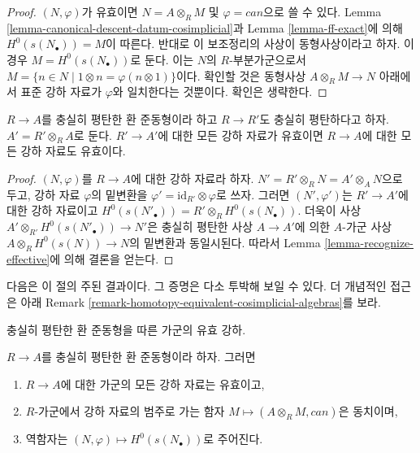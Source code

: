 \begin{proof}
$(N, \varphi)$가 유효이면 $N = A \otimes_R M$ 및 $\varphi = can$으로
쓸 수 있다. Lemma \ref{lemma-canonical-descent-datum-cosimplicial}과
Lemma \ref{lemma-ff-exact}에 의해 $H^0(s(N_\bullet)) = M$이 따른다.
반대로 이 보조정리의 사상이 동형사상이라고 하자. 이 경우
$M = H^0(s(N_\bullet))$로 둔다. 이는 $N$의 $R$-부분가군으로서
$M = \{n \in N \mid 1 \otimes n = \varphi(n \otimes 1)\}$이다.
확인할 것은 동형사상 $A \otimes_R M \to N$ 아래에서 표준 강하 자료가
$\varphi$와 일치한다는 것뿐이다. 확인은 생략한다.
\end{proof}

\begin{lemma}
\label{lemma-descent-descends}
$R \to A$를 충실히 평탄한 환 준동형이라 하고 $R \to R'$도 충실히 평탄하다고
하자. $A' = R' \otimes_R A$로 둔다. $R' \to A'$에 대한 모든 강하 자료가
유효이면 $R \to A$에 대한 모든 강하 자료도 유효이다.
\end{lemma}

\begin{proof}
$(N, \varphi)$를 $R \to A$에 대한 강하 자료라 하자.
$N' = R' \otimes_R N = A' \otimes_A N$으로 두고, 강하 자료 $\varphi$의
밑변환을 $\varphi' = \text{id}_{R'} \otimes \varphi$로 쓰자. 그러면
$(N', \varphi')$는 $R' \to A'$에 대한 강하 자료이고
$H^0(s(N'_\bullet)) = R' \otimes_R H^0(s(N_\bullet))$.
더욱이 사상 $A' \otimes_{R'} H^0(s(N'_\bullet)) \to N'$은 충실히 평탄한 사상
$A \to A'$에 의한 $A$-가군 사상
$A \otimes_R H^0(s(N)) \to N$의 밑변환과 동일시된다. 따라서 Lemma
\ref{lemma-recognize-effective}에 의해 결론을 얻는다.
\end{proof}

\noindent
다음은 이 절의 주된 결과이다. 그 증명은 다소 투박해 보일 수 있다.
더 개념적인 접근은 아래 Remark
\ref{remark-homotopy-equivalent-cosimplicial-algebras}를 보라.

\begin{proposition}
\label{proposition-descent-module}
\begin{slogan}
충실히 평탄한 환 준동형을 따른 가군의 유효 강하.
\end{slogan}
$R \to A$를 충실히 평탄한 환 준동형이라 하자. 그러면
\begin{enumerate}
\item $R \to A$에 대한 가군의 모든 강하 자료는 유효이고,
\item $R$-가군에서 강하 자료의 범주로 가는 함자
$M \mapsto (A \otimes_R M, can)$은 동치이며,
\item 역함자는 $(N, \varphi) \mapsto H^0(s(N_\bullet))$로 주어진다.
\end{enumerate}
\end{proposition}

